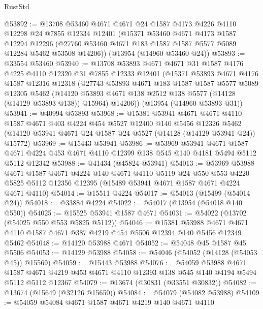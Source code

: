 \begin{lexlean}{RustStd}
\begin{coremodule}
@53892 := @13708
    @53460
    @4671
    @4671
    @24
    @1587
    @4173
    @4226
    @4110
    @12298
    @24
    @7855
    @12334
    @12401
    (@15371
      @53460
      @4671
      @4173
      @1587
      @12294
      @12296
      (@27760 @53460 @4671 @183 @1587 @1587 @5577 @5089 @12284 @5462 @53508 @14206))
    (@13954 (@14960 @53460 @24))
@53893 := @33554 @53460
@53940 := @13708
    @53893
    @4671
    @4671
    @31
    @1587
    @4176
    @4225
    @4110
    @12320
    @31
    @7855
    @12333
    @12401
    (@15371
      @53893
      @4671
      @4176
      @1587
      @12316
      @12318
      (@27743
        @53893
        @4671
        @183
        @1587
        @1587
        @5577
        @5089
        @12305
        @5462
        (@14120 @53893 @4671 @138 @2512 @138 @5577 (@14128 (@14129 @53893 @138)) @15964)
        @14206))
    (@13954 (@14960 @53893 @31))
@53941 := @40994 @53893
@53968 := @15381
    @53941
    @4671
    @4671
    @4110
    @1587
    @4671
    @403
    @4224
    @454
    @5527
    @12400
    @140
    @5456
    @12326
    @5462
    (@14120 @53941 @4671 @24 @1587 @24 @5527 (@14128 (@14129 @53941 @24)) @15772)
@53969 := @15443 @53941
@53986 := @53969
    @53941
    @4671
    @1587
    @4671
    @4224
    @453
    @4671
    @4110
    @12399
    @138
    @545
    @140
    @4181
    @5494
    @5112
    @5112
    @12342
@53988 := @41434 (@45824 @53941)
@54013 := @53969
    @53988
    @4671
    @1587
    @4671
    @4224
    @140
    @4671
    @4110
    @5119
    @24
    @550
    @553
    @4220
    @5825
    @5112
    @12356
    @12395
    (@15489 @53941 @4671 @1587 @4671 @4224 @4671 @4110)
@54014 := @15511 @4224
@54017 := @54013 (@15499 (@54014 @24))
@54018 := @33884 @4224
@54022 := @54017 (@13954 (@54018 @140 @550))
@54025 := @15525 @53941 @1587 @4671
@54031 := @54022 (@13702 (@54025 @550 @553 @5825 @5112))
@54046 := @15381
    @53988
    @4671
    @4671
    @4110
    @1587
    @4671
    @387
    @4219
    @454
    @5506
    @12394
    @140
    @5456
    @12349
    @5462
@54048 := @14120 @53988 @4671
@54052 := @54048 @45 @1587 @45 @5506
@54053 := @14129 @53988
@54058 := @54046 (@54052 (@14128 (@54053 @45)) @15569)
@54059 := @15443 @53988
@54076 := @54059
    @53988
    @4671
    @1587
    @4671
    @4219
    @453
    @4671
    @4110
    @12393
    @138
    @545
    @140
    @4194
    @5494
    @5112
    @5112
    @12367
@54079 := @13674 (@30831 (@33551 @30832))
@54082 := @13674 (@15649 (@32126 @15650))
@54084 := @54079 (@54082 @53988)
@54109 := @54059
    @54084
    @4671
    @1587
    @4671
    @4219
    @140
    @4671
    @4110

\end{coremodule}
\end{lexlean}
